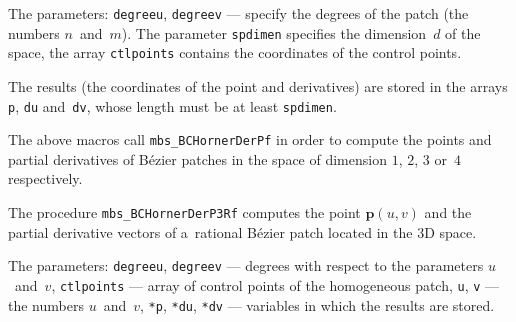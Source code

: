 The parameters: \texttt{degreeu}, \texttt{degreev} --- specify the degrees
of the patch (the numbers $n$~and~$m$). The parameter \texttt{spdimen}
specifies the dimension~$d$ of the space, the array \texttt{ctlpoints}
contains the coordinates of the control points.

The results (the coordinates of the point and derivatives) are
stored in the arrays \texttt{p}, \texttt{du} and~\texttt{dv}, whose length
must be at least \texttt{spdimen}.

\vspace{\bigskipamount}
The above macros call \texttt{mbs\_BCHornerDerPf} in order to compute
the points and partial derivatives of B\'{e}zier patches in the space
of dimension $1$, $2$, $3$ or~$4$ respectively.

\vspace{\bigskipamount}
The procedure \texttt{mbs\_BCHornerDerP3Rf} computes the point $\bm{p}(u,v)$
and the partial derivative vectors of a~rational B\'{e}zier patch located
in the $3$D space.

The parameters: \texttt{degreeu}, \texttt{degreev} --- degrees with respect to
the parameters $u$~and~$v$, \texttt{ctlpoints} --- array of control points of
the homogeneous patch, \texttt{u}, \texttt{v} --- the numbers
$u$~and~$v$, \texttt{*p}, \texttt{*du}, \texttt{*dv} --- variables in
which the results are stored.

